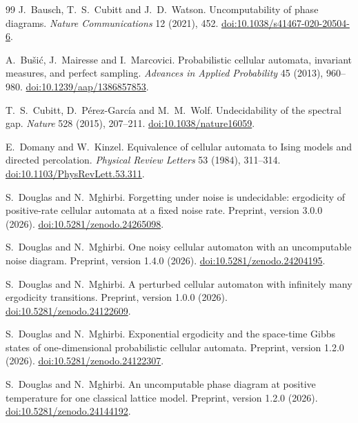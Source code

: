 {}
\begin{thebibliography}{99}
 J.~Bausch, T.~S.~Cubitt and J.~D.~Watson.
Uncomputability of phase diagrams.
\emph{Nature Communications} 12 (2021), 452.
\href{https://doi.org/10.1038/s41467-020-20504-6}{doi:10.1038/s41467-020-20504-6}.

 A.~Bu\v{s}i\'c, J.~Mairesse and I.~Marcovici.
Probabilistic cellular automata, invariant measures, and perfect sampling.
\emph{Advances in Applied Probability} 45 (2013), 960--980.
\href{https://doi.org/10.1239/aap/1386857853}{doi:10.1239/aap/1386857853}.

 T.~S.~Cubitt, D.~P\'erez-Garc\'ia and M.~M.~Wolf.
Undecidability of the spectral gap.
\emph{Nature} 528 (2015), 207--211.
\href{https://doi.org/10.1038/nature16059}{doi:10.1038/nature16059}.

 E.~Domany and W.~Kinzel.
Equivalence of cellular automata to Ising models and directed percolation.
\emph{Physical Review Letters} 53 (1984), 311--314.
\href{https://doi.org/10.1103/PhysRevLett.53.311}{doi:10.1103/PhysRevLett.53.311}.

 S.~Douglas and N.~Mghirbi.
Forgetting under noise is undecidable: ergodicity of positive-rate cellular automata at a fixed noise rate.
Preprint, version 3.0.0 (2026).
\href{https://doi.org/10.5281/zenodo.24265098}{doi:10.5281/zenodo.24265098}.

 S.~Douglas and N.~Mghirbi.
One noisy cellular automaton with an uncomputable noise diagram.
Preprint, version 1.4.0 (2026).
\href{https://doi.org/10.5281/zenodo.24204195}{doi:10.5281/zenodo.24204195}.

 S.~Douglas and N.~Mghirbi.
A perturbed cellular automaton with infinitely many ergodicity transitions.
Preprint, version 1.0.0 (2026).
\href{https://doi.org/10.5281/zenodo.24122609}{doi:10.5281/zenodo.24122609}.

 S.~Douglas and N.~Mghirbi.
Exponential ergodicity and the space-time Gibbs states of one-dimensional probabilistic cellular automata.
Preprint, version 1.2.0 (2026).
\href{https://doi.org/10.5281/zenodo.24122307}{doi:10.5281/zenodo.24122307}.

 S.~Douglas and N.~Mghirbi.
An uncomputable phase diagram at positive temperature for one classical lattice model.
Preprint, version 1.2.0 (2026).
\href{https://doi.org/10.5281/zenodo.24144192}{doi:10.5281/zenodo.24144192}.


\end{thebibliography}
